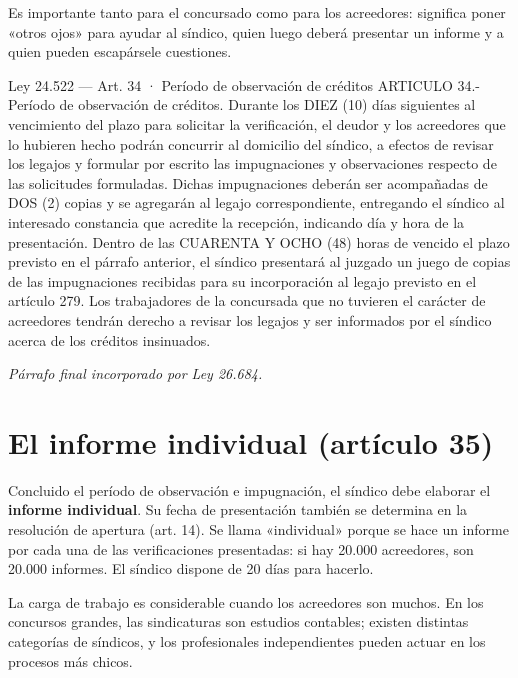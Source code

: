 \documentclass[12pt,oneside]{book}
\begin{document}
Es importante tanto para el concursado como para los acreedores: significa poner «otros ojos» para ayudar al síndico, quien luego deberá presentar un informe y a quien pueden escapársele cuestiones.

\begin{legal}{Ley 24.522 — Art. 34 · Período de observación de créditos}
ARTICULO 34.- Período de observación de créditos. Durante los DIEZ (10) días siguientes al vencimiento del plazo para solicitar la verificación, el deudor y los acreedores que lo hubieren hecho podrán concurrir al domicilio del síndico, a efectos de revisar los legajos y formular por escrito las impugnaciones y observaciones respecto de las solicitudes formuladas. Dichas impugnaciones deberán ser acompañadas de DOS (2) copias y se agregarán al legajo correspondiente, entregando el síndico al interesado constancia que acredite la recepción, indicando día y hora de la presentación. Dentro de las CUARENTA Y OCHO (48) horas de vencido el plazo previsto en el párrafo anterior, el síndico presentará al juzgado un juego de copias de las impugnaciones recibidas para su incorporación al legajo previsto en el artículo 279. Los trabajadores de la concursada que no tuvieren el carácter de acreedores tendrán derecho a revisar los legajos y ser informados por el síndico acerca de los créditos insinuados.

{\footnotesize\itshape Párrafo final incorporado por Ley 26.684.}
\end{legal}

\section{El informe individual (artículo 35)}

Concluido el período de observación e impugnación, el síndico debe elaborar el \textbf{informe individual}. Su fecha de presentación también se determina en la resolución de apertura (art. 14). Se llama «individual» porque se hace un informe por cada una de las verificaciones presentadas: si hay 20.000 acreedores, son 20.000 informes. El síndico dispone de 20 días para hacerlo.

La carga de trabajo es considerable cuando los acreedores son muchos. En los concursos grandes, las sindicaturas son estudios contables; existen distintas categorías de síndicos, y los profesionales independientes pueden actuar en los procesos más chicos.
\end{document}
